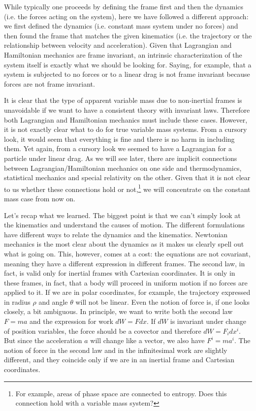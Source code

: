 While typically one proceeds by defining the frame first and then the dynamics (i.e. the forces acting on the system), here we have followed a different approach: we first defined the dynamics (i.e. constant mass system under no forces) and then found the frame that matches the given kinematics (i.e. the trajectory or the relationship between velocity and acceleration). Given that Lagrangian and Hamiltonian mechanics are frame invariant, an intrinsic characterization of the system itself is exactly what we should be looking for. Saying, for example, that a system is subjected to no forces or to a linear drag is not frame invariant because forces are not frame invariant.

It is clear that the type of apparent variable mass due to non-inertial frames is unavoidable if we want to have a consistent theory with invariant laws. Therefore both Lagrangian and Hamiltonian mechanics must include these cases. However, it is not exactly clear what to do for true variable mass systems. From a cursory look, it would seem that everything is fine and there is no harm in including them. Yet again, from a cursory look we seemed to have a Lagrangian for a particle under linear drag. As we will see later, there are implicit connections between Lagrangian/Hamiltonian mechanics on one side and thermodynamics, statistical mechanics and special relativity on the other. Given that it is not clear to us whether these connections hold or not,\footnote{For example, areas of phase space are connected to entropy. Does this connection hold with a variable mass system?} we will concentrate on the constant mass case from now on.

Let's recap what we learned. The biggest point is that we can't simply look at the kinematics and understand the causes of motion. The different formulations have different ways to relate the dynamics and the kinematics. Newtonian mechanics is the most clear about the dynamics as it makes us clearly spell out what is going on. This, however, comes at a cost: the equations are not covariant, meaning they have a different expression in different frames. The second law, in fact, is valid only for inertial frames with Cartesian coordinates. It is only in these frames, in fact, that a body will proceed in uniform motion if no forces are applied to it. If we are in polar coordinates, for example, the trajectory expressed in radius $\rho$ and angle $\theta$ will not be linear. Even the notion of force is, if one looks closely, a bit ambiguous. In principle, we want to write both the second law $F=ma$ and the expression for work $dW = F dx$. If $dW$ is invariant under change of position variables, the force should be a covector and therefore $dW = F_i dx^i$. But since the acceleration $a$ will change like a vector, we also have $F^i = m a^i$. The notion of force in the second law and in the infinitesimal work are slightly different, and they coincide only if we are in an inertial frame and Cartesian coordinates.

